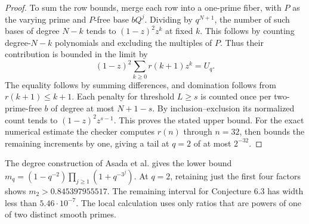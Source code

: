 \begin{proof}
To sum the row bounds, merge each row into a one-prime fiber, with $P$ as the varying prime and $P$-free base $bQ^j$. Dividing by $q^{N+1}$, the number of such bases of degree $N-k$ tends to $(1-z)^2 z^k$ at fixed $k$. This follows by counting degree-$N-k$ polynomials and excluding the multiples of $P$. Thus their contribution is bounded in the limit by
\[
 (1-z)^2\sum_{k\ge0}r(k+1)z^k=U_q .
\]
The equality follows by summing differences, and domination follows from $r(k+1)\le k+1$. Each penalty for threshold $L\ge s$ is counted once per two-prime-free $b$ of degree at most $N+1-s$. By inclusion--exclusion its normalized count tends to $(1-z)^2z^{s-1}$. This proves the stated upper bound. For the exact numerical estimate the checker computes $r(n)$ through $n=32$, then bounds the remaining increments by one, giving a tail at $q=2$ of at most $2^{-32}$.
\end{proof}

The degree construction of Asada et al. gives the lower bound $m_q=(1-q^{-2})\prod_{j\ge1}(1+q^{-3^j})$. At $q=2$, retaining just the first four factors shows $m_2>0.845397955517$. The remaining interval for Conjecture 6.3 has width less than $5.46\cdot10^{-7}$. The local calculation uses only ratios that are powers of one of two distinct smooth primes.
